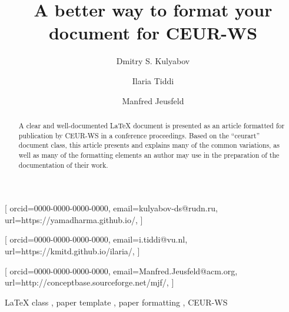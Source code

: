 \documentclass[%
]{ceurart}
\begin{document}


\title{A better way to format your document for CEUR-WS}

\tnotemark[1]

\author[1,2]{Dmitry S. Kulyabov}[%
orcid=0000-0000-0000-0000,
email=kulyabov-ds@rudn.ru,
url=https://yamadharma.github.io/,
]
\cormark[1]
\fnmark[1]
\address[1]{RUDN University,
  6 Miklukho-Maklaya St, Moscow, 117198, Russian Federation}
\address[2]{Joint Institute for Nuclear Research,
  6 Joliot-Curie St, Dubna, 141980, Russian Federation}

\author[3]{Ilaria Tiddi}[%
orcid=0000-0000-0000-0000,
email=i.tiddi@vu.nl,
url=https://kmitd.github.io/ilaria/,
]
\fnmark[1]
\address[3]{Vrije Universiteit Amsterdam, De Boelelaan 1105, 1081 HV Amsterdam, The Netherlands}

\author[4]{Manfred Jeusfeld}[%
orcid=0000-0000-0000-0000,
email=Manfred.Jeusfeld@acm.org,
url=http://conceptbase.sourceforge.net/mjf/,
]
\fnmark[1]
\address[4]{University of Skövde, Högskolevägen 1, 541 28 Skövde, Sweden}


\begin{abstract}
  A clear and well-documented \LaTeX{} document is presented as an article formatted for publication by CEUR-WS in a conference proceedings.
  Based on the \enquote{ceurart} document class, this article presents and explains many of the common variations, as well as many of the formatting elements an author may use in the preparation of the documentation of their work.
\end{abstract}

\begin{keywords}
  LaTeX class \sep
  paper template \sep
  paper formatting \sep
  CEUR-WS
\end{keywords}
\end{document}

